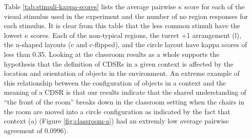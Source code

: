 \documentclass[11pt,letterpaper]{article}
\begin{document}
Table \ref{tab:stimuli-kappa-scores} lists the average pairwise $\kappa$ score for each of the visual stimulus used in the experiment and the number of no region responses for each stimulus.  It is clear from this table that the less common stimuli have the lowest $\kappa$ scores.  Each of the non-typical regions, the turret +1 arrangement (l), the u-shaped layouts (c and c-flipped), and the circle layout have kappa scores of less than 0.35. Looking at the classroom results as a whole supports the hypothesis that the definition of CDSRs in a given context is affected by the location and orientation of objects in the environment. An extreme example of this relationship between the configuration of objects in a context and the meaning of a CDSR is that our results indicate that the shared understanding of ``the front of the room'' breaks down in the classroom setting when the chairs in the room are moved into a circle configuration as indicated by the fact that context (a) (Figure \ref{fig:classroom-a}) had an extremly low average pairwise agreement of  $0.0996$).



\end{document}
